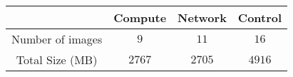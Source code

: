 
\begin{tabular}{|c|c|c|c|}
   \hline
   & Compute & Network & Control\\
   \hline
   Number of images & $9$ & $11$ & $16$\\
   \hline
   Total Size (MB) & $2767$ & $2705$ & $4916$\\
   \hline
\end{tabular}

